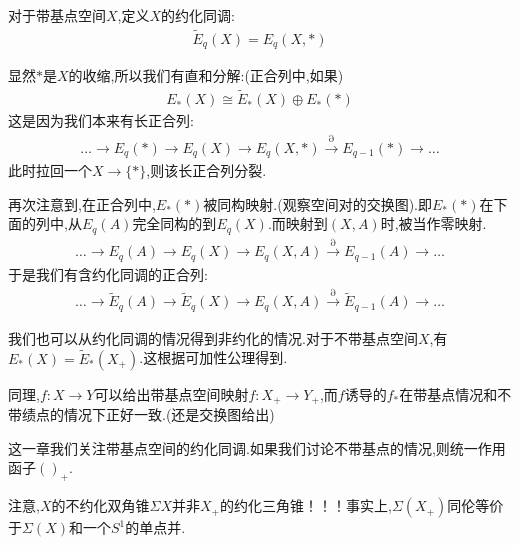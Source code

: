 对于带基点空间$X$,定义$X$的约化同调:
\begin{align*}
    \tilde{E}_q(X)=E_q(X,*)
\end{align*}

显然$*$是$X$的收缩,所以我们有直和分解:(正合列中,如果)
\begin{align*}
    E_*(X)\cong \tilde{E}_*(X)\oplus E_*(*) 
\end{align*}
这是因为我们本来有长正合列:
\begin{align*}
    \dots  \to E_q(*) \to E_q(X) \to E_q(X,*) \stackrel{\partial}{\rightarrow} E_{q-1}(*)\to \dots
\end{align*}
此时拉回一个$X \to \{*\}$,则该长正合列分裂.

再次注意到,在正合列中,$E_*(*)$被同构映射.(观察空间对的交换图).即$E_*(*)$在下面的列中,从$E_q(A)$完全同构的到$E_q(X)$.而映射到$(X,A)$时,被当作零映射.
\begin{align*}
    \dots  \to E_q(A) \to E_q(X) \to E_q(X,A) \stackrel{\partial}{\rightarrow} E_{q-1}(A)\to \dots
\end{align*}
于是我们有含约化同调的正合列:
\begin{align*}
    \dots  \to \tilde{E}_q(A) \to \tilde{E}_q(X) \to E_q(X,A) \stackrel{\partial}{\rightarrow} \tilde{E}_{q-1}(A)\to \dots
\end{align*}

我们也可以从约化同调的情况得到非约化的情况.对于不带基点空间$X$,有$E_*(X)=\tilde{E}_*(X_+)$.这根据可加性公理得到.

同理,$f:X \to Y$可以给出带基点空间映射$f:X_+ \to Y_+$,而$f$诱导的$f_*$在带基点情况和不带绩点的情况下正好一致.(还是交换图给出)

这一章我们关注带基点空间的约化同调.如果我们讨论不带基点的情况,则统一作用函子$()_{+}$.

注意,$X$的不约化双角锥$\Sigma X$并非$X_+$的约化三角锥！！！事实上,$\Sigma(X_+)$同伦等价于$\Sigma(X)$和一个$S^1$的单点并.
